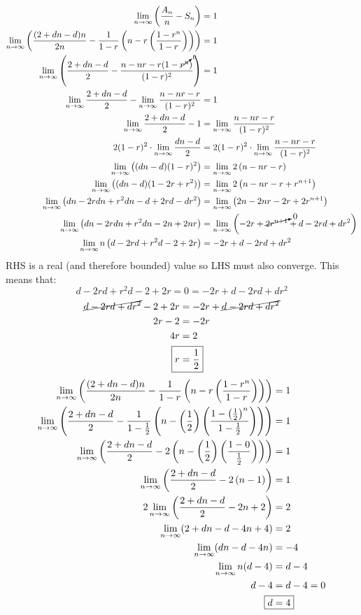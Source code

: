 \documentclass{article}
\begin{document}
\begin{align*}
	\lim_{n\to\infty}\left(\frac{A_n}{n}-S_n\right)&=1 \\
	\lim_{n\to\infty}\left(\frac{(2+dn-d)n}{2n}-\frac{1}{1-r}
		\left(n-r\left(\frac{1-r^n}{1-r}\right)\right)\right)&=1 \\
	\lim_{n\to\infty}\left(\frac{2+dn-d}{2}-
		\frac{n-nr-r(1-\cancelto{0}{r^n})}{(1-r)^2}\right)&=1 \\
	\lim_{n\to\infty}\frac{2+dn-d}{2}-
		\lim_{n\to\infty}\frac{n-nr-r}{(1-r)^2}&=1 \\
	\lim_{n\to\infty}\frac{2+dn-d}{2}-1
		&=\lim_{n\to\infty}\frac{n-nr-r}{(1-r)^2} \\
	2(1-r)^2\cdot\lim_{n\to\infty}\frac{dn-d}{2}&=2(1-r)^2\cdot
		\lim_{n\to\infty}\frac{n-nr-r}{(1-r)^2} \\
	\lim_{n\to\infty}\left((dn-d)(1-r)^2\right)&=
		\lim_{n\to\infty}2\left(n-nr-r\right) \\
	\lim_{n\to\infty}\left((dn-d)(1-2r+r^2)\right)&=
		\lim_{n\to\infty}2\left(n-nr-r+r^{n+1}\right) \\
	\lim_{n\to\infty}\left(dn-2rdn+r^2dn-d+2rd-dr^2\right)&=
		\lim_{n\to\infty}\left(2n-2nr-2r+2r^{n+1}\right) \\
	\lim_{n\to\infty}\left(dn-2rdn+r^2dn-2n+2nr\right)&=
		\lim_{n\to\infty}\left(-2r+\cancelto{0}{2r^{n+1}}+d
		-2rd+dr^2\right) \\
	\lim_{n\to\infty}n\left(d-2rd+r^2d-2+2r\right)&=
		-2r+d-2rd+dr^2 \\
\end{align*}
RHS is a real (and therefore bounded) value so LHS must also
converge. This means that:
\begin{equation*}
	d-2rd+r^2d-2+2r=0=-2r+d-2rd+dr^2
\end{equation*}
\begin{align*}
	\cancel{d-2rd+dr^2}-2+2r&=-2r+\cancel{d-2rd+dr^2} \\
	2r-2&=-2r \\
	4r&=2 \\
	\Aboxed{r&=\frac{1}{2}}
\end{align*}
\begin{align*}
	\lim_{n\to\infty}\left(\frac{(2+dn-d)n}{2n}-\frac{1}{1-r}
		\left(n-r\left(\frac{1-r^n}{1-r}\right)\right)\right)&=1 \\
	\lim_{n\to\infty}\left(\frac{2+dn-d}{2}-\frac{1}{1
		-\frac{1}{2}}\left(n-\left(\frac{1}{2}\right)\left(
		\frac{1-\left(\frac{1}{2}\right)^n}{1-\frac{1}{2}}\right)
		\right)\right)&=1 \\
	\lim_{n\to\infty}\left(\frac{2+dn-d}{2}-2\left(n-\left(\frac{1}{2}
		\right)\left(\frac{1-0}{\frac{1}{2}}\right)\right)\right)&=1 \\
	\lim_{n\to\infty}\left(\frac{2+dn-d}{2}-2\left(n-1\right)
		\right)&=1 \\
	2\lim_{n\to\infty}\left(\frac{2+dn-d}{2}-2n+2 \right)&=2 \\
	\lim_{n\to\infty}(2+dn-d-4n+4)&=2 \\
	\lim_{n\to\infty}(dn-d-4n)&=-4 \\
	\lim_{n\to\infty}n(d-4)&=d-4 \\
	d-4&=d-4=0 \\
	\Aboxed{d&=4}
\end{align*}
\end{document}
